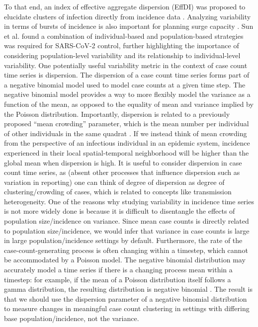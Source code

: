 \documentclass[10pt,letterpaper]{article}
\begin{document}
\noindent To that end, an index of effective aggregate dispersion (EffDI) was proposed to elucidate clusters of infection directly from incidence data \cite{schneckenreither_assessing_2023}. 
Analyzing variability in terms of bursts of incidence is also important for planning surge capacity \cite{wallinga_metropolitan_2018}. 
Sun et al. \cite{sun_transmission_2021} found a combination of individual-based and population-based strategies was required for SARS-CoV-2 control, further highlighting the importance of considering population-level variability and its relationship to individual-level variability.
\noindent One potentially useful variability metric in the context of case count time series is dispersion. 
The dispersion of a case count time series forms part of a negative binomial model used to model case counts at a given time step. 
The negative binomial model provides a way to more flexibly model the variance as a function of the mean, as opposed to the equality of mean and variance implied by the Poisson distribution. 
Importantly, dispersion is related to a previously proposed ``mean crowding'' parameter, which is the mean number per individual of other individuals in the same quadrat \cite{lloyd_mean_1967}. 
If we instead think of mean crowding from the perspective of an infectious individual in an epidemic system, incidence experienced in their local spatial-temporal neighborhood will be higher than the global mean when dispersion is high. 
It is useful to consider dispersion in case count time series, as (absent other processes that influence dispersion such as variation in reporting) one can think of degree of dispersion as degree of clustering/crowding of cases, which is related to concepts like transmission heterogeneity. 
\noindent One of the reasons why studying variability in incidence time series is not more widely done is because it is difficult to disentangle the effects of population size/incidence on variance. 
Since mean case counts is directly related to population size/incidence, we would infer that variance in case counts is large in large population/incidence settings by default. 
Furthermore, the rate of the case-count-generating process is often changing within a timestep, which cannot be accommodated by a Poisson model. 
The negative binomial distribution may accurately model a time series if there is a changing process mean within a timestep: for example, if the mean of a Poisson distribution itself follows a gamma distribution, the resulting distribution is negative binomial \cite{cook_notes_nodate}. 
The result is that we should use the dispersion parameter of a negative binomial distribution to measure changes in meaningful case count clustering in settings with differing base population/incidence, not the variance. 
\end{document}
